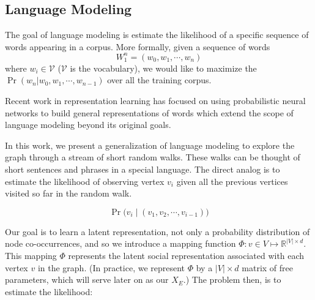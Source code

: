 \documentclass{sig-alternate}
\newcommand{\comment}[1]{}
\begin{document}


\subsection{Language Modeling}
The goal of language modeling is estimate the likelihood of a specific sequence of words appearing in a corpus.
More formally, given a sequence of words $$W_{1}^{n} = (w_0, w_1, \cdots, w_n)$$ where $w_i \in \mathcal{V}$ ($\mathcal{V}$ is the vocabulary), we would like to maximize the $\Pr(w_n| w_0, w_1, \cdots, w_{n-1})$ over all the training corpus.
\comment{
The performance of the model will be evaluated on held out testing corpus using a perplexity score $PP$ as defined below
\begin{equation}
PP = \frac{1}{\sqrt[n]{P(W_1^n)}}
\end{equation}}

Recent work in representation learning has focused on using probabilistic neural networks to build general representations of words which extend the scope of language modeling beyond its original goals.

In this work, we present a generalization of language modeling to explore the graph through a stream of short random walks.
These walks can be thought of short sentences and phrases in a special language.
The direct analog is to estimate the likelihood of observing vertex $v_i$ given all the previous vertices visited so far in the random walk.

$$\Pr\big(v_{i}\mid( v_1, v_2, \cdots, v_{i-1})\big)$$

Our goal is to learn a latent representation, not only a probability distribution of node co-occurrences, and so we introduce a mapping function $\Phi \colon v \in V \mapsto \mathbb{R}^{|V|\times d}$.
This mapping $\Phi$ represents the latent social representation associated with each vertex $v$ in the graph.
(In practice, we represent $\Phi$ by a $|V| \times d$ matrix of free parameters, which will serve later on as our $X_E$.)
The problem then, is to estimate the likelihood:
\end{document}
